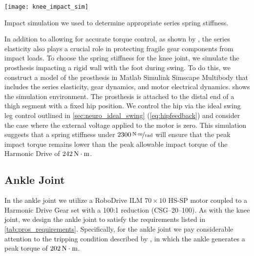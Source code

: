 \begin{marginfigure}[2.5in]
    \centering 
    \texttt{[image: knee\_impact\_sim]}
    \caption{Impact simulation we used to determine appropriate series spring
    stiffness.}\label{fig:knee_impact_sim}
\end{marginfigure}
In addition to allowing for accurate torque control, as shown by
\citet{au2007biomechanical,au2008powered}, the series elasticity also plays a
crucial role in protecting fragile gear components from impact loads. To choose
the spring stiffness for the knee joint, we simulate the prosthesis impacting a
rigid wall with the foot during swing. To do this, we construct a model of the
prosthesis in Matlab Simulink Simscape Multibody that includes the
series elasticity, gear dynamics, and motor electrical dynamics.
 shows the simulation environment. The prosthesis is
attached to the distal end of a thigh segment with a fixed hip position. We
control the hip via the ideal swing leg control outlined in
\cref{sec:neuro_ideal_swing} (\cref{eq:hipfeedback}) and consider the case where
the external voltage applied to the motor is zero. This simulation suggests that
a spring stiffness under $\unitfrac[2300]{N \cdot m}{rad}$ will ensure that the
peak impact torque remains lower than the peak allowable impact torque of the
Harmonic Drive of $\unit[242]{N \cdot m}$.

\subsection{Ankle Joint}
In the ankle joint we utilize a RoboDrive ILM $70\times10$ HS-SP motor coupled
to a Harmonic Drive Gear set with a 100:1 reduction (CSG--20--100). As with the
knee joint, we design the ankle joint to satisfy the requirements listed in
\cref{tab:pros_requirements}. Specifically, for the ankle joint we pay
considerable attention to the tripping condition described by
\citet{pijnappels2005early}, in which the ankle generates a peak torque of
$\unit[202]{N \cdot m}$. 

